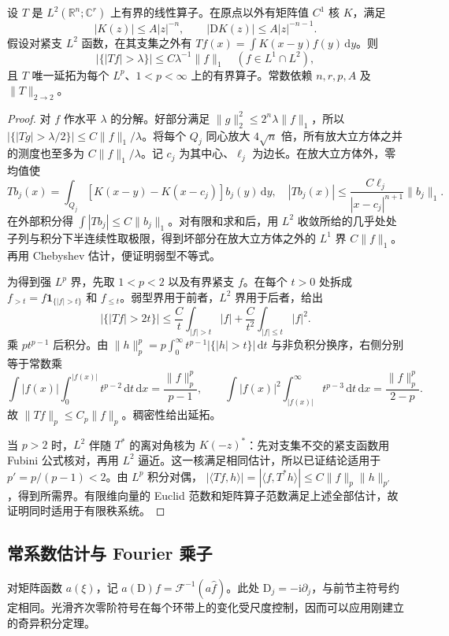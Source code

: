 \begin{theorem}\label{g3:thm:cz-lp-module}
	设 \(T\) 是 \(L^2(\mathbb R^n;\mathbb C^r)\) 上有界的线性算子。在原点以外有矩阵值 \(C^1\) 核 \(K\)，满足
	\[
		|K(z)|\le A|z|^{-n},\qquad|\mathrm DK(z)|\le A|z|^{-n-1}.
	\]
	假设对紧支 \(L^2\) 函数，在其支集之外有 \(Tf(x)=\int K(x-y)f(y)\,\mathrm dy\)。则
	\[
		|\{|Tf|>\lambda\}|\le C\lambda^{-1}\|f\|_1
		\quad(f\in L^1\cap L^2),
	\]
	且 \(T\) 唯一延拓为每个 \(L^p\)、\(1<p<\infty\) 上的有界算子。常数依赖 \(n,r,p,A\) 及 \(\|T\|_{2\to2}\)。
\end{theorem}
\begin{proof}
	对 \(f\) 作水平 \(\lambda\) 的分解。好部分满足 \(\|g\|_2^2\le2^n\lambda\|f\|_1\)，所以 \(|\{|Tg|>\lambda/2\}|\le C\|f\|_1/\lambda\)。将每个 \(Q_j\) 同心放大 \(4\sqrt n\) 倍，所有放大立方体之并的测度也至多为 \(C\|f\|_1/\lambda\)。记 \(c_j\) 为其中心、\(\ell_j\) 为边长。在放大立方体外，零均值使
	\[
		Tb_j(x)=\int_{Q_j}[K(x-y)-K(x-c_j)]b_j(y)\,\mathrm dy,
		\quad |Tb_j(x)|\le\frac{C\ell_j}{|x-c_j|^{n+1}}\|b_j\|_1.
	\]
	在外部积分得 \(\int|Tb_j|\le C\|b_j\|_1\)。对有限和求和后，用 \(L^2\) 收敛所给的几乎处处子列与积分下半连续性取极限，得到坏部分在放大立方体之外的 \(L^1\) 界 \(C\|f\|_1\)。再用 Chebyshev 估计，便证明弱型不等式。

	为得到强 \(L^p\) 界，先取 \(1<p<2\) 以及有界紧支 \(f\)。在每个 \(t>0\) 处拆成 \(f_{>t}=f\mathbf1_{\{|f|>t\}}\) 和 \(f_{\le t}\)。弱型界用于前者，\(L^2\) 界用于后者，给出
	\[
		|\{|Tf|>2t\}|\le\frac C t\int_{|f|>t}|f|
		+\frac C{t^2}\int_{|f|\le t}|f|^2.
	\]
	乘 \(p t^{p-1}\) 后积分。由 \(\|h\|_p^p=p\int_0^\infty t^{p-1}|\{|h|>t\}|\,\mathrm dt\) 与非负积分换序，右侧分别等于常数乘
	\[
		\int |f(x)|\int_0^{|f(x)|}t^{p-2}\,\mathrm dt\,\mathrm dx
		=\frac{\|f\|_p^p}{p-1},\qquad
		\int |f(x)|^2\int_{|f(x)|}^\infty t^{p-3}\,\mathrm dt\,\mathrm dx
		=\frac{\|f\|_p^p}{2-p}.
	\]
	故 \(\|Tf\|_p\le C_p\|f\|_p\)。稠密性给出延拓。

	当 \(p>2\) 时，\(L^2\) 伴随 \(T^*\) 的离对角核为 \(K(-z)^*\)：先对支集不交的紧支函数用 Fubini 公式核对，再用 \(L^2\) 逼近。这一核满足相同估计，所以已证结论适用于 \(p'=p/(p-1)<2\)。由 \(L^p\) 积分对偶，
	\( |\langle Tf,h\rangle|=|\langle f,T^*h\rangle|\le C\|f\|_p\|h\|_{p'}\)，得到所需界。有限维向量的 Euclid 范数和矩阵算子范数满足上述全部估计，故证明同时适用于有限秩系统。
\end{proof}

\subsection{常系数估计与 Fourier 乘子}
\label{g3:subsec:1204:03}
对矩阵函数 \(a(\xi)\)，记 \(a(\mathrm D)f=\mathcal F^{-1}(a\widehat f)\)。此处 \(\mathrm D_j=-\mathrm i\partial_j\)，与前节主符号约定相同。光滑齐次零阶符号在每个环带上的变化受尺度控制，因而可以应用刚建立的奇异积分定理。

